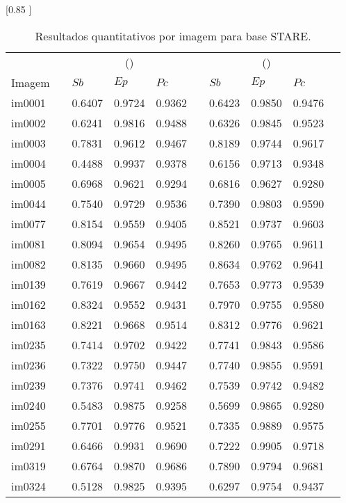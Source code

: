 \begin{table}[h!] 
\caption{Resultados quantitativos por imagem para base STARE.} 
\label{tabAllSTARE} 
\centering 
\scalebox {0.85 }[0.85 ]{  
\begin{tabular}{llllllllll}  
\toprule  
&  & \multicolumn{3}{c}{\citeauthor{Zana:2001} (\citeyear{Zana:2001})} &  & \multicolumn{3}{c}{\citeauthor{Soares:2006} (\citeyear{Soares:2006})} \\  
\cmidrule{3-5} \cmidrule{7-9}  
Imagem &  & $Sb$ & $Ep$ & $Pc$ & & $Sb$ & $Ep$ & $Pc$ \\  
\midrule  
im0001 &  & 0.6407 & 0.9724 & 0.9362 & & 0.6423 & 0.9850 & 0.9476  \\  
im0002 &  & 0.6241 & 0.9816 & 0.9488 & & 0.6326 & 0.9845 & 0.9523  \\  
im0003 &  & 0.7831 & 0.9612 & 0.9467 & & 0.8189 & 0.9744 & 0.9617  \\  
im0004 &  & 0.4488 & 0.9937 & 0.9378 & & 0.6156 & 0.9713 & 0.9348  \\  
im0005 &  & 0.6968 & 0.9621 & 0.9294 & & 0.6816 & 0.9627 & 0.9280  \\  
im0044 &  & 0.7540 & 0.9729 & 0.9536 & & 0.7390 & 0.9803 & 0.9590  \\  
im0077 &  & 0.8154 & 0.9559 & 0.9405 & & 0.8521 & 0.9737 & 0.9603  \\  
im0081 &  & 0.8094 & 0.9654 & 0.9495 & & 0.8260 & 0.9765 & 0.9611  \\  
im0082 &  & 0.8135 & 0.9660 & 0.9495 & & 0.8634 & 0.9762 & 0.9641  \\  
im0139 &  & 0.7619 & 0.9667 & 0.9442 & & 0.7653 & 0.9773 & 0.9539  \\  
im0162 &  & 0.8324 & 0.9552 & 0.9431 & & 0.7970 & 0.9755 & 0.9580  \\  
im0163 &  & 0.8221 & 0.9668 & 0.9514 & & 0.8312 & 0.9776 & 0.9621  \\  
im0235 &  & 0.7414 & 0.9702 & 0.9422 & & 0.7741 & 0.9843 & 0.9586  \\  
im0236 &  & 0.7322 & 0.9750 & 0.9447 & & 0.7740 & 0.9855 & 0.9591  \\  
im0239 &  & 0.7376 & 0.9741 & 0.9462 & & 0.7539 & 0.9742 & 0.9482  \\  
im0240 &  & 0.5483 & 0.9875 & 0.9258 & & 0.5699 & 0.9865 & 0.9280  \\  
im0255 &  & 0.7701 & 0.9776 & 0.9521 & & 0.7335 & 0.9889 & 0.9575  \\  
im0291 &  & 0.6466 & 0.9931 & 0.9690 & & 0.7222 & 0.9905 & 0.9718  \\  
im0319 &  & 0.6764 & 0.9870 & 0.9686 & & 0.7890 & 0.9794 & 0.9681  \\  
im0324 &  & 0.5128 & 0.9825 & 0.9395 & & 0.6297 & 0.9754 & 0.9437  \\  
\bottomrule  
\end{tabular}  
}  
\end{table}  




